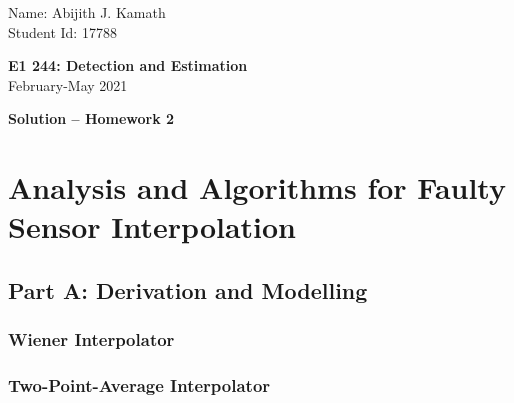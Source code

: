 \documentclass[11pt]{article}
\begin{document}
\thispagestyle{empty}

{\small
\begin{flushleft}
   Name: Abijith J. Kamath\\
   Student Id: 17788
\end{flushleft}
}
\vspace{2ex}
\begin{center}
    {\Large\bf E1 244: Detection and Estimation}\\
    February-May 2021

\vspace{5mm}
{\bf Solution -- Homework 2}
\end{center}
\vspace{5mm}

\section*{Analysis and Algorithms for Faulty Sensor Interpolation}


\subsection*{Part A: Derivation and Modelling}
\label{subsec:partA}



\subsubsection*{Wiener Interpolator}
\label{subsubsec:wiener}



\subsubsection*{Two-Point-Average Interpolator}
\label{subsubsec:avginterp}


\end{document}
